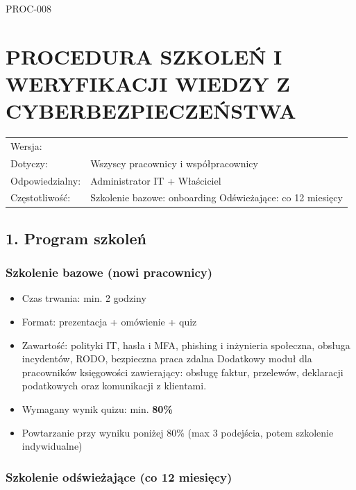 \documentclass[12pt,a4paper]{article}
\providecommand{\tightlist}{\setlength{\itemsep}{0pt}\setlength{\parskip}{0pt}}
\begin{document}
\label{doc8}
PROC-008

\section{PROCEDURA SZKOLEŃ I WERYFIKACJI WIEDZY Z
CYBERBEZPIECZEŃSTWA}\label{procedura-szkoleux144-i-weryfikacji-wiedzy-z-cyberbezpieczeux144stwa}

\begin{longtable}[]{@{}>{\raggedright\arraybackslash}p{}>{\raggedright\arraybackslash}p{}@{}}
\toprule\noalign{}
\endhead
\bottomrule\noalign{}
\endlastfoot
Wersja: & 1.0 \\
Dotyczy: & Wszyscy pracownicy i współpracownicy \\
Odpowiedzialny: & Administrator IT + Właściciel \\
Częstotliwość: & Szkolenie bazowe: onboarding \textbar{} Odświeżające:
co 12 miesięcy \\
\end{longtable}

\subsection{1. Program szkoleń}\label{program-szkoleux144}

\subsubsection{Szkolenie bazowe (nowi
pracownicy)}\label{szkolenie-bazowe-nowi-pracownicy}

\begin{itemize}
\tightlist
\item
  Czas trwania: min. 2 godziny
\item
  Format: prezentacja + omówienie + quiz
\item
  Zawartość: polityki IT, hasła i MFA, phishing i inżynieria społeczna,
  obsługa incydentów, RODO, bezpieczna praca zdalna
  Dodatkowy moduł dla pracowników księgowości zawierający:
  obsługę faktur, przelewów, deklaracji podatkowych oraz komunikacji z klientami.
\item
  Wymagany wynik quizu: min. \textbf{80\%}
\item
  Powtarzanie przy wyniku poniżej 80\% (max 3 podejścia, potem szkolenie
  indywidualne)
\end{itemize}

\subsubsection{Szkolenie odświeżające (co 12
miesięcy)}\label{szkolenie-odux15bwieux17cajux105ce-co-12-miesiux119cy}
\end{document}
